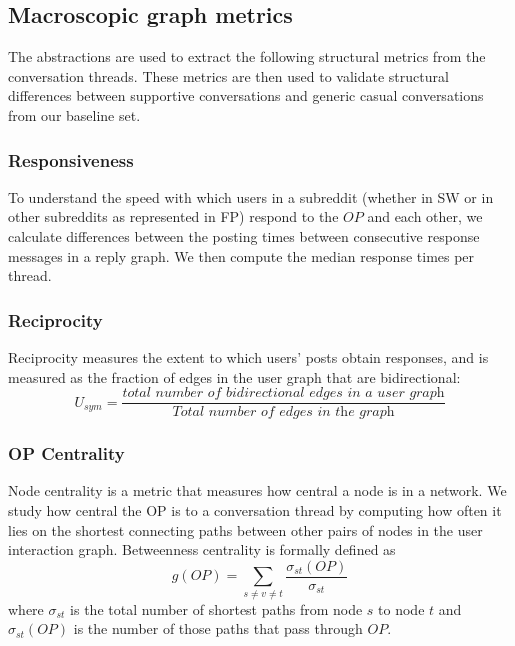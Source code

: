 


\subsection{Macroscopic graph metrics}
The abstractions are used to extract the following structural metrics from the conversation threads. These metrics are then used to validate structural differences between supportive conversations and generic casual conversations from our baseline set.%



\subsubsection{Responsiveness}
To understand the speed with which users in a subreddit (whether in SW or in other subreddits as represented in FP) respond to the $OP$ and each other,  we calculate differences between the posting times between consecutive response messages in a reply graph. We then compute the median response times per thread.


\subsubsection{Reciprocity}
Reciprocity measures the extent to which users' posts obtain responses, and is measured as the fraction of edges in the user graph that are bidirectional:
$$
U_{sym}=\frac{\textit{total number of bidirectional edges in a user graph}}{\textit{Total number of edges in the graph}}
$$

\subsubsection{OP Centrality} \label{sec:centrality}
Node centrality is a metric that measures how central a node is in a network. We study how central the OP is to a conversation thread by computing how often it lies on the shortest connecting paths between other pairs of nodes in the user interaction graph. Betweenness centrality is formally defined as 
$$
g(OP) = \sum_{s \neq v \neq t}\frac{\sigma_{st}(OP)}{\sigma_{st}}
$$
where $\sigma_{st}$ is the total number of shortest paths from node $s$ to node $t$ and $\sigma_{st}(OP)$ is the number of those paths that pass through $OP$. %


